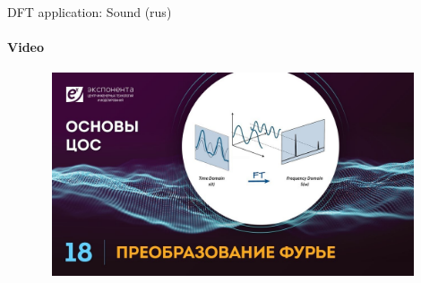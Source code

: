 \documentclass[aspectratio=169]{beamer}
\begin{document}
\begin{frame}[t]{DFT application: Sound (rus)}
    \framesubtitle{Video}
    \vspace{-0.6cm}
    \begin{figure}[H]
        \href{https://youtu.be/T0xlzPBdx6s?t=237}{
            \centering\includegraphics[height=6cm,width=1\textwidth,keepaspectratio]{fft_sound.jpg}}
        \label{fig:fft_sound.jpg}
    \end{figure}
\end{frame}
\end{document}
